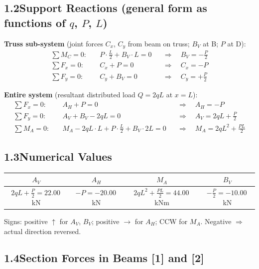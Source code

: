 \documentclass[a4paper,11pt]{article}
\begin{document}
\subsection*{1.2\quad Support Reactions (general form as functions of $q$, $P$, $L$)}

\textbf{Truss sub-system}
(joint forces $C_x$, $C_y$ from beam on truss; $B_V$ at B; $P$ at D):
\begin{align*}
  \sum M_C = 0:\quad & P \cdot \tfrac{L}{2} + B_V \cdot L = 0
    &&\Rightarrow\quad \boxed{B_V = -\tfrac{P}{2}} \\
  \sum F_x = 0:\quad & C_x + P = 0
    &&\Rightarrow\quad C_x = -P \\
  \sum F_y = 0:\quad & C_y + B_V = 0
    &&\Rightarrow\quad C_y = +\tfrac{P}{2}
\end{align*}

\textbf{Entire system} (resultant distributed load $Q = 2qL$ at $x = L$):
\begin{align*}
  \sum F_x = 0:\quad & A_H + P = 0
    &&\Rightarrow\quad \boxed{A_H = -P} \\
  \sum F_y = 0:\quad & A_V + B_V - 2qL = 0
    &&\Rightarrow\quad \boxed{A_V = 2qL + \tfrac{P}{2}} \\
  \sum M_A = 0:\quad & M_A - 2qL \cdot L + P\cdot\tfrac{L}{2} + B_V \cdot 2L = 0
    &&\Rightarrow\quad \boxed{M_A = 2qL^2 + \tfrac{PL}{2}}
\end{align*}

\subsection*{1.3\quad Numerical Values}

\begin{center}
\begin{tabular}{cccc}
\toprule
$A_V$ & $A_H$ & $M_A$ & $B_V$ \\
\midrule
$2qL + \tfrac{P}{2} = \mathbf{22.00}$\,kN
& $-P = \mathbf{-20.00}$\,kN
& $2qL^2 + \tfrac{PL}{2} = \mathbf{44.00}$\,kNm
& $-\tfrac{P}{2} = \mathbf{-10.00}$\,kN \\
\bottomrule
\end{tabular}
\end{center}

Signs: positive $\uparrow$ for $A_V$, $B_V$; positive $\rightarrow$ for $A_H$;
CCW for $M_A$. Negative $\Rightarrow$ actual direction reversed.

\subsection*{1.4\quad Section Forces in Beams [1] and [2]}
\end{document}
